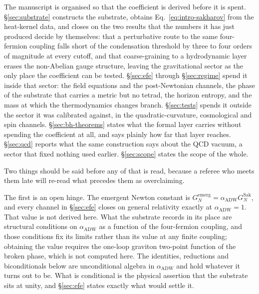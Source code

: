 \documentclass[aps,prd,nofootinbib,superscriptaddress,12pt]{revtex4-2}
\begin{document}
The manuscript is organised so that the coefficient is derived before it is
spent. \S\ref{sec:substrate} constructs the substrate, obtains
Eq.~\eqref{eq:intro-sakharov} from the heat-kernel data, and closes on the two
results that the numbers it has just produced decide by themselves: that a
perturbative route to the same four-fermion coupling falls short of the
condensation threshold by three to four orders of magnitude at every cutoff, and
that coarse-graining to a hydrodynamic layer erases the non-Abelian gauge
structure, leaving the gravitational sector as the only place the coefficient
can be tested. \S\ref{sec:efe} through \S\ref{sec:regime} spend it inside that
sector: the field equations and the post-Newtonian channels, the phase of the
substrate that carries a metric but no tetrad, the horizon entropy, and the mass
at which the thermodynamics changes branch. \S\ref{sec:tests} spends it outside
the sector it was calibrated against, in the quadratic-curvature, cosmological
and spin channels. \S\ref{sec:bh-theorems} states what the formal layer carries
without spending the coefficient at all, and says plainly how far that layer
reaches. \S\ref{sec:qcd} reports what the same construction says about the QCD
vacuum, a sector that fixed nothing used earlier. \S\ref{sec:scope} states the
scope of the whole.

Two things should be said before any of that is read, because a referee who
meets them late will re-read what precedes them as overclaiming.

The first is an open hinge. The emergent Newton constant is
$G_N^{\mathrm{emerg}} = \alpha_{\mathrm{ADW}} G_N^{\mathrm{Sak}}$, and every
channel in \S\ref{sec:efe} closes on general relativity exactly at
$\alpha_{\mathrm{ADW}} = 1$. That value is not derived here. What the substrate
records in its place are structural conditions on $\alpha_{\mathrm{ADW}}$ as a
function of the four-fermion coupling, and those conditions fix its limits
rather than its value at any finite coupling; obtaining the value requires the
one-loop graviton two-point function of the broken phase, which is not computed
here. The identities, reductions and biconditionals below are unconditional
algebra in $\alpha_{\mathrm{ADW}}$ and hold whatever it turns out to be. What is
conditional is the physical assertion that the substrate sits at unity, and
\S\ref{sec:efe} states exactly what would settle it.
\end{document}
